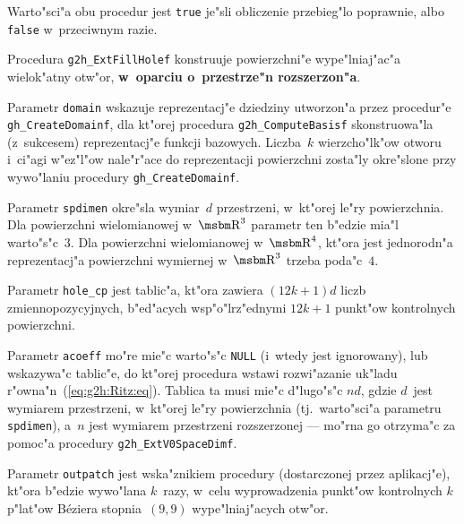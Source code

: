\vspace{\medskipamount}
Warto"sci"a obu procedur jest \texttt{true} je"sli obliczenie przebieg"lo
poprawnie, albo \texttt{false} w~przeciwnym razie.

\vspace{\bigskipamount}
\begin{sloppypar}
Procedura \texttt{g2h\_ExtFillHolef} konstruuje powierzchni"e wype"lniaj"ac"a
wielok"atny otw"or, \textbf{w~oparciu o~przestrze"n rozszerzon"a}.%
\end{sloppypar}

\begin{sloppypar}
Parametr \texttt{domain} wskazuje reprezentacj"e dziedziny
utworzon"a przez procedur"e \texttt{gh\_CreateDomainf}, dla kt"orej procedura
\texttt{g2h\_ComputeBasisf} skonstruowa"la (z~sukcesem) reprezentacj"e
funkcji bazowych. Liczba~$k$ wierzcho"lk"ow otworu i~ci"agi w"ez\-"l"ow
nale"r"ace do reprezentacji powierzchni zosta"ly okre"slone przy wywo"laniu
procedury \texttt{gh\_CreateDomainf}.%
\end{sloppypar}

Parametr \texttt{spdimen} okre"sla wymiar~$d$ przestrzeni, w~kt"orej le"ry
powierzchnia. Dla powierzchni wielomianowej w~$\R^3$ parametr ten b"edzie
mia"l warto"s"c~$3$. Dla powierzchni wielomianowej w~$\R^4$, kt"ora jest
jednorodn"a reprezentacj"a powierzchni wymiernej w~$\R^3$ trzeba poda"c~$4$.

Parametr \texttt{hole\_cp} jest tablic"a, kt"ora zawiera $(12k+1)d$ liczb
zmiennopozycyjnych, b"ed"acych wsp"o"lrz"ednymi $12k+1$ punkt"ow kontrolnych
powierzchni.

Parametr \texttt{acoeff} mo"re mie"c warto"s"c \texttt{NULL}
(i~wtedy jest ignorowany), lub wskazywa"c tablic"e, do kt"orej procedura
wstawi rozwi"azanie uk"ladu r"owna"n~(\ref{eq:g2h:Ritz:eq}). Tab\-li\-ca ta musi
mie"c d"lugo"s"c $nd$, gdzie $d$~jest wymiarem przestrzeni, w~kt"orej le"ry
powierzchnia (tj.\ warto"sci"a parametru \texttt{spdimen}), a~$n$ jest
wymiarem przestrzeni rozszerzonej --- mo"rna go otrzyma"c za pomoc"a procedury
\texttt{g2h\_ExtV0SpaceDimf}.

Parametr \texttt{outpatch} jest wska"znikiem procedury (dostarczonej przez
aplikacj"e), kt"ora b"edzie wywo"lana $k$~razy, w~celu wyprowadzenia
punkt"ow kontrolnych $k$ p"lat"ow B\'{e}ziera stopnia~$(9,9)$ wype"lniaj"acych
otw"or.


